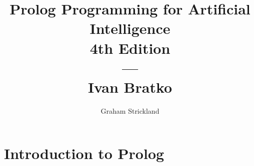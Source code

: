\documentclass{article}
\title{
    Prolog Programming for Artificial Intelligence\\4th Edition\\---\\
    Ivan Bratko
}
\author{Graham Strickland}
\begin{document}
\maketitle  

\section{Introduction to Prolog}

\end{document}
